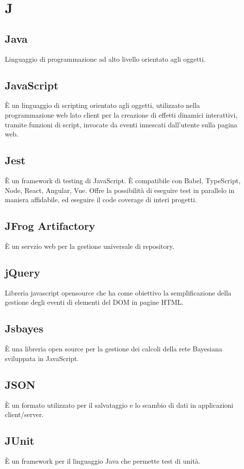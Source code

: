 \section*{J}

\subsection{Java}
Linguaggio di programmazione ad alto livello orientato agli oggetti. 

\subsection{JavaScript}
È un linguaggio di scripting orientato agli oggetti, utilizzato nella programmazione web lato client per la creazione di effetti dinamici interattivi, tramite funzioni di script, invocate da eventi innescati dall'utente sulla pagina web.

\subsection{Jest} 
È un framework di testing di JavaScript. È compatibile con Babel, TypeScript, Node, React, Angular, Vue. Offre la possibilità di eseguire test in parallelo in maniera affidabile, ed eseguire il code coverage di interi progetti.

\subsection{JFrog Artifactory} 
È un servzio web per la gestione universale di repository.

\subsection{jQuery}
Libreria javascript opensource che ha come obiettivo la semplificazione della gestione degli eventi di elementi del DOM in pagine HTML. 

\subsection{Jsbayes}
È una libreria open source per la gestione dei calcoli della rete Bayesiana sviluppata in JavaScript.

\subsection{JSON}
È un formato utilizzato per il salvataggio e lo scambio di dati in applicazioni client/server.

\subsection{JUnit}
È un framework per il linguaggio Java che permette test di unità.